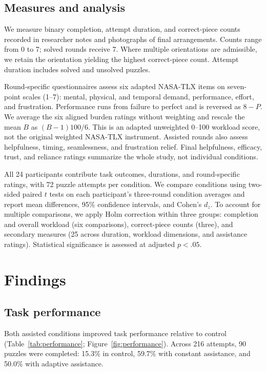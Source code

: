 \documentclass[sigconf,anonymous]{aamas}
\begin{document}
\subsection{Measures and analysis}

We measure binary completion, attempt duration, and correct-piece counts recorded in researcher notes and photographs of final arrangements. Counts range from 0 to 7; solved rounds receive 7. Where multiple orientations are admissible, we retain the orientation yielding the highest correct-piece count. Attempt duration includes solved and unsolved puzzles.

Round-specific questionnaires assess six adapted NASA-TLX items \cite{hart2006} on seven-point scales (1--7): mental, physical, and temporal demand, performance, effort, and frustration. Performance runs from failure to perfect and is reversed as $8-P$. We average the six aligned burden ratings without weighting and rescale the mean $B$ as $(B-1)100/6$. This is an adapted unweighted 0--100 workload score, not the original weighted NASA-TLX instrument. Assisted rounds also assess helpfulness, timing, seamlessness, and frustration relief. Final helpfulness, efficacy, trust, and reliance ratings summarize the whole study, not individual conditions.

All 24 participants contribute task outcomes, durations, and round-specific ratings, with 72 puzzle attempts per condition. We compare conditions using two-sided paired $t$ tests on each participant's three-round condition averages and report mean differences, 95\% confidence intervals, and Cohen's $d_z$. To account for multiple comparisons, we apply Holm correction within three groups: completion and overall workload (six comparisons), correct-piece counts (three), and secondary measures (25 across duration, workload dimensions, and assistance ratings). Statistical significance is assessed at adjusted $p<.05$.

\section{Findings}

\subsection{Task performance}
Both assisted conditions improved task performance relative to control (Table~\ref{tab:performance}; Figure~\ref{fig:performance}). Across 216 attempts, 90 puzzles were completed: 15.3\% in control, 59.7\% with constant assistance, and 50.0\% with adaptive assistance.
\end{document}
